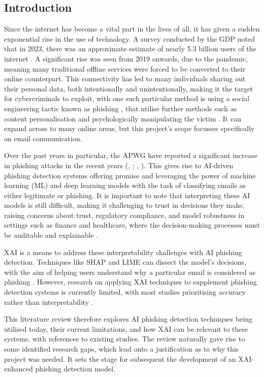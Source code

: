 
\subsection*{Introduction}

Since the internet has become a vital part in the lives of all, it has given a sudden exponential rise in the use of technology. A survey conducted by the GDP noted that in 2023, there was an approximate estimate of nearly 5.3 billion users of the internet \citep{kemp2022digital}. A significant rise was seen from 2019 onwards, due to the pandemic, meaning many traditional offline services were forced to be converted to their online counterpart. This connectivity has led to many individuals sharing out their personal data, both intentionally and unintentionally, making it the target for cybercriminals to exploit, with one such particular method is using a social engineering tactic known as phishing \citep{zahra2022detecting}, that utilise further methods such as content personalisation and psychologically manipulating the victim \citep{jagatic2007social}. It can expand across to many online areas, but this project's scope focusses specifically on email communication.\newline

\noindent Over the past years in particular, the APWG have reported a significant increase in phishing attacks in the recent years (\citeauthor{chirra2020ai}, \citeyear{chirra2020ai}; \citeauthor{syed2018ensuring}, \citeyear{syed2018ensuring}). This gives rise to AI-driven phishing detection systems offering promise and leveraging the power of machine learning (ML) and deep learning models with the task of classifying emails as either legitimate or phishing. It is important to note that interpreting these AI models is still difficult, making it challenging to trust in decisions they make, raising concerns about trust, regulatory compliance, and model robustness in settings such as finance and healthcare, where the decision-making processes must be auditable and explainable \citep{jain2022survey}.\newline

\noindent XAI is a means to address these interpretability challenges with AI phishing detection. Techniques like SHAP and LIME can dissect the model's decisions, with the aim of helping users understand why a particular email is considered as phishing \citep{lundberg2017unified}. However, research on applying XAI techniques to supplement phishing detection systems is currently limited, with most studies prioritising accuracy rather than interpretability \citep{ribeiro2016model}.\newline

\noindent This literature review therefore explores AI phishing detection techniques being utilised today, their current limitations, and how XAI can be relevant to these systems, with references to existing studies. The review naturally gave rise to some identified research gaps, which lead onto a justification as to why this project was needed. It sets the stage for subsequent the development of an XAI-enhanced phishing detection model.
